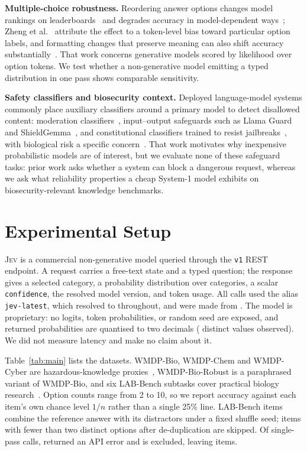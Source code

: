 \documentclass[conference]{IEEEtran}
\newcommand{\jev}{\textsc{Jev}}
\begin{document}
\textbf{Multiple-choice robustness.} Reordering answer options changes model rankings on leaderboards~\cite{alzahrani} and
degrades accuracy in model-dependent ways~\cite{gupta}; Zheng et al.~\cite{zheng}
attribute the effect to a token-level bias toward particular option labels, and
formatting changes that preserve meaning can also shift accuracy
substantially~\cite{formatspread}. That work concerns generative models scored by likelihood
over option tokens. We test whether a non-generative model emitting a typed distribution in
one pass shows comparable sensitivity.

\textbf{Safety classifiers and biosecurity context.} Deployed language-model systems
commonly place auxiliary classifiers around a primary model to detect disallowed content:
moderation classifiers~\cite{openaimod}, input--output safeguards such as Llama
Guard~\cite{llamaguard} and ShieldGemma~\cite{shieldgemma}, and constitutional classifiers
trained to resist jailbreaks~\cite{constclass}, with biological risk a specific
concern~\cite{biorisk}. That work motivates why inexpensive probabilistic models are of
interest, but we evaluate none of these safeguard tasks: prior work asks whether a system
can block a dangerous request, whereas we ask what reliability properties a cheap System-1
model exhibits on biosecurity-relevant knowledge benchmarks.

\section{Experimental Setup}
\label{sec:setup}

\jev{} is a commercial non-generative model queried through the \texttt{v1} REST endpoint.
A request carries a free-text state and a typed question; the response gives a selected
category, a probability distribution over categories, a scalar \texttt{confidence}, the
resolved model version, and token usage. All calls used the alias \texttt{jev-latest},
which resolved to \texttt{\statModelVersion{}} throughout, and were made from
\statCollectionDates{}. The model is proprietary: no logits, token probabilities, or random
seed are exposed, and returned probabilities are quantised to two decimals
(\statDistinctProbs{} distinct values observed). We did not measure latency and make no
claim about it.

Table~\ref{tab:main} lists the \statNDatasets{} datasets. WMDP-Bio, WMDP-Chem and
WMDP-Cyber are hazardous-knowledge proxies~\cite{wmdp}, WMDP-Bio-Robust is a paraphrased
variant of WMDP-Bio, and six LAB-Bench subtasks cover practical biology
research~\cite{labbench}. Option counts range from 2 to 10, so we report accuracy against
each item's own chance level $1/n$ rather than a single 25\% line. LAB-Bench items combine
the reference answer with its distractors under a fixed shuffle seed; items with fewer than
two distinct options after de-duplication are skipped. Of \statNItemsRaw{} single-pass
calls, \statNErrors{} returned an API error and is excluded, leaving \statNItems{} items.
\end{document}
